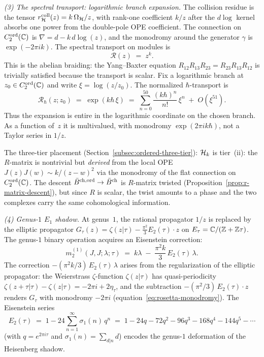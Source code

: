 \begin{computation}
\smallskip
\noindent
\emph{(3) The spectral transport: logarithmic branch expansion.}
The collision residue is the tensor
$r^{\mathrm{coll}}_{\mathcal{H}}(z)=k\,\Omega_{\mathcal{H}}/z$, with rank-one
coefficient $k/z$ after the $d\log$ kernel absorbs one power from
the double-pole OPE coefficient. The
connection on $C_2^{\mathrm{ord}}(\mathbb{C})$ is
$\nabla = d - k\, d\log(z)$, and the monodromy around
the generator $\gamma$ is $\exp(-2\pi i k)$. The spectral
transport on modules is
\begin{equation}\label{eq:e1-shadow-R}
\mathcal R(z) \;=\; z^k.
\end{equation}
This is the abelian braiding: the Yang--Baxter equation
$R_{12}R_{13}R_{23} = R_{23}R_{13}R_{12}$ is trivially satisfied
because the transport is scalar.  Fix a logarithmic branch at
$z_0\in C_2^{\mathrm{ord}}(\mathbb{C})$ and write
$\xi=\log(z/z_0)$.  The normalized $\hbar$-transport is
\begin{equation}\label{eq:e1-R-log-expansion}
\mathcal R_\hbar(z;z_0)
\;=\;
\exp(k\hbar\,\xi)
\;=\;
\sum_{n=0}^{50}\frac{(k\hbar)^n}{n!}\,\xi^n
\;+\;O(\xi^{51}).
\end{equation}
Thus the expansion is entire in the logarithmic coordinate on the
chosen branch.  As a function of~$z$ it is multivalued, with monodromy
\(\exp(2\pi i k\hbar)\), not a Taylor series in \(1/z\).

The three-tier placement
(Section~\ref{subsec:ordered-three-tier}): $\mathcal{H}_k$ is
tier~(ii): the $R$-matrix is nontrivial but \emph{derived}
from the local OPE $J(z)J(w) \sim k/(z-w)^2$ via the
monodromy of the flat connection on $C_2^{\mathrm{ord}}(\mathbb{C})$.
The descent $\bar{B}^{\mathrm{ch,ord}} \to \bar{B}^{\mathrm{ch}}$ is
$R$-matrix twisted
(Proposition~\ref{prop:r-matrix-descent}), but since
$R$ is scalar, the twist amounts to a phase and the two
complexes carry the same cohomological information.

\smallskip
\noindent
\emph{(4) Genus-$1$ $E_1$ shadow.}
At genus~$1$, the rational propagator $1/z$ is replaced by the
elliptic propagator $G_\tau(z) = \zeta(z|\tau) - \tfrac{\pi^2}{3}
E_2(\tau)\cdot z$ on $E_\tau = \mathbb{C}/(\mathbb{Z} + \mathbb{Z}\tau)$.
The genus-$1$ binary operation acquires an Eisenstein correction:
\begin{equation}\label{eq:e1-shadow-genus1-m2}
m_2^{(1)}(J,J;\lambda;\tau)
\;=\;
k\lambda
\;-\;
\frac{\pi^2 k}{3}\, E_2(\tau)\, \lambda.
\end{equation}
The correction $-(\pi^2 k/3)\, E_2(\tau)\, \lambda$ arises from
the regularization of the elliptic propagator: the Weierstrass
$\zeta$-function $\zeta(z|\tau)$ has quasi-periodicity
$\zeta(z+\tau|\tau) - \zeta(z|\tau) = -2\pi i + 2\eta_\tau$,
and the subtraction $-(\pi^2/3)\, E_2(\tau)\cdot z$ renders $G_\tau$
with monodromy $-2\pi i$
(equation~\eqref{eq:rosetta-monodromy}). The Eisenstein series
\begin{equation}\label{eq:e2-expansion}
E_2(\tau)
\;=\;
1 - 24\sum_{n=1}^{\infty} \sigma_1(n)\, q^n
\;=\;
1 - 24q - 72q^2 - 96q^3 - 168q^4 - 144q^5 - \cdots
\end{equation}
(with $q = e^{2\pi i \tau}$ and $\sigma_1(n) = \sum_{d|n} d$)
encodes the genus-$1$ deformation of the Heisenberg shadow.


\end{computation}
